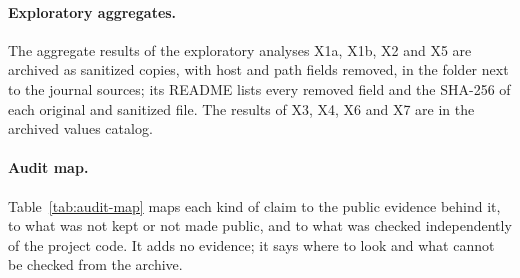 \paragraph{Exploratory aggregates.}
The aggregate results of the exploratory analyses X1a, X1b, X2 and X5 are archived as sanitized copies, with host and path fields removed, in the folder  next to the journal sources; its README lists every removed field and the SHA-256 of each original and sanitized file. The results of X3, X4, X6 and X7 are in the archived values catalog.

\paragraph{Audit map.}
Table~\ref{tab:audit-map} maps each kind of claim to the public evidence behind it, to what was not kept or not made public, and to what was checked independently of the project code. It adds no evidence; it says where to look and what cannot be checked from the archive.

